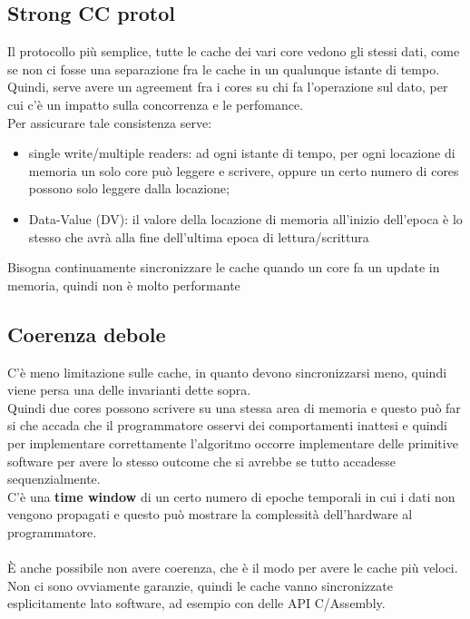 \documentclass[12pt, oneside]{extbook} %
\begin{document}
\subsection{Strong CC protol}
Il protocollo più semplice, tutte le cache dei vari core vedono gli stessi dati, come se non ci fosse una separazione fra le cache in un qualunque istante di tempo. Quindi, serve avere un agreement fra i cores su chi fa l'operazione sul dato, per cui c'è un impatto sulla concorrenza e le perfomance.\\ Per assicurare tale consistenza serve:
\begin{itemize}
\item single write/multiple readers: ad ogni istante di tempo, per ogni locazione di memoria un solo core può leggere e scrivere, oppure un certo numero di cores possono solo leggere dalla locazione;
\item Data-Value (DV): il valore della locazione di memoria all'inizio dell'epoca è lo stesso che avrà alla fine dell'ultima epoca di lettura/scrittura
\end{itemize}
Bisogna continuamente sincronizzare le cache quando un core fa un update in memoria, quindi non è molto performante
\subsection{Coerenza debole}
C'è meno limitazione sulle cache, in quanto devono sincronizzarsi meno, quindi viene persa una delle invarianti dette sopra.\\ Quindi due cores possono scrivere su una stessa area di memoria e questo può far si che accada che il programmatore osservi dei comportamenti inattesi e quindi per implementare correttamente l'algoritmo occorre implementare delle primitive software per avere lo stesso outcome che si avrebbe se tutto accadesse sequenzialmente.\\ C'è una \textbf{time window} di un certo numero di epoche temporali in cui i dati non vengono propagati e questo può mostrare la complessità dell'hardware al programmatore.\\\\ È anche possibile non avere coerenza, che è il modo per avere le cache più veloci. Non ci sono ovviamente garanzie, quindi le cache vanno sincronizzate esplicitamente lato software, ad esempio con delle API C/Assembly.
\end{document}
